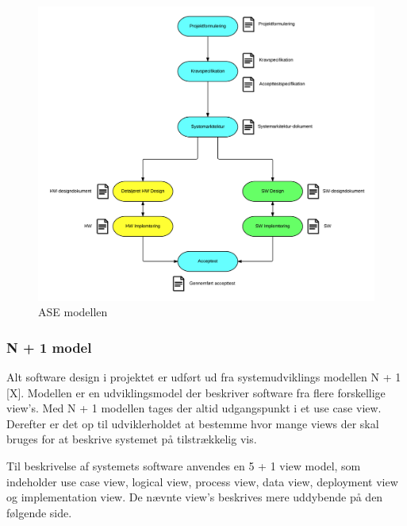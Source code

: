 \begin{figure}[H]
	\centering
	\includegraphics[width=1\textwidth]{Billeder/Udviklingsproces/ase_model}
	\caption{ASE modellen}
	\label{fig:dokument_udvikling}
\end{figure}

\newpage

\subsubsection{N + 1 model}
Alt software design i projektet er udført ud fra systemudviklings modellen N + 1 [X]. 
Modellen er en udviklingsmodel der beskriver software fra flere forskellige view's.  
Med N + 1 modellen tages der altid udgangspunkt i et use case view. Derefter er det op til udviklerholdet at bestemme hvor mange views der skal bruges for at beskrive systemet på tilstrækkelig vis. 

Til beskrivelse af systemets software anvendes en 5 + 1 view model, som indeholder use case view, logical view, process view, data view, deployment view og implementation view. De nævnte view's beskrives mere uddybende på den følgende side. 

